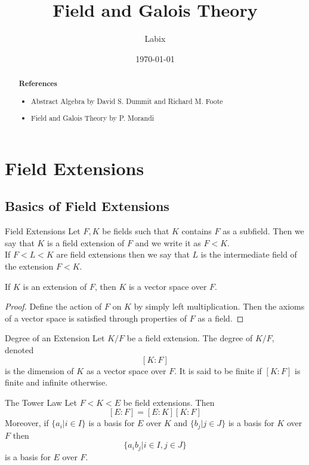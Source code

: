 \documentclass[a4paper]{article}
\title{Field and Galois Theory}
\author{Labix}
\date{\today}
\begin{document}
\maketitle
\begin{abstract}

\textbf{References}
\begin{itemize}
\item Abstract Algebra by David S. Dummit and Richard M. Foote
\item Field and Galois Theory by P. Morandi
\end{itemize}
\end{abstract}
\pagebreak
\tableofcontents

\pagebreak
\section{Field Extensions}
\subsection{Basics of Field Extensions}
\begin{defn}{Field Extensions}{} Let $F,K$ be fields such that $K$ contains $F$ as a subfield. Then we say that $K$ is a field extension of $F$ and we write it as $F<K$. \\
If $F<L<K$ are field extensions then we say that $L$ is the intermediate field of the extension $F<K$. 
\end{defn}

\begin{prp}{}{} If $K$ is an extension of $F$, then $K$ is a vector space over $F$. 
\begin{proof}
Define the action of $F$ on $K$ by simply left multiplication. Then the axioms of a vector space is satisfied through properties of $F$ as a field. 
\end{proof}
\end{prp}

\begin{defn}{Degree of an Extension}{} Let $K/F$ be a field extension. The degree of $K/F$, denoted $$[K:F]$$ is the dimension of $K$ as a vector space over $F$. It is said to be finite if $[K:F]$ is finite and infinite otherwise. 
\end{defn}

\begin{prp}{The Tower Law}{} Let $F<K<E$ be field extensions. Then $$[E:F]=[E:K][K:F]$$ Moreover, if $\{a_i|i\in I\}$ is a basis for $E$ over $K$ and $\{b_j|j\in J\}$ is a basis for $K$ over $F$ then $$\{a_ib_j|i\in I, j\in J\}$$ is a basis for $E$ over $F$. 
\end{prp}
\end{document}
